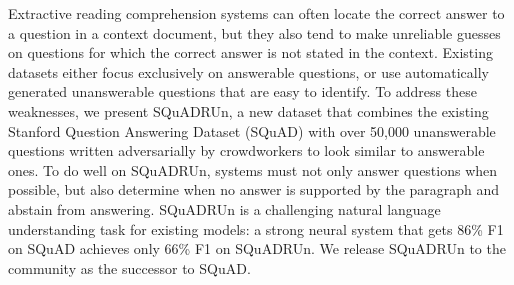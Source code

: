 Extractive reading comprehension systems can often locate the correct answer to a question in a context document, but they also tend to make unreliable guesses on questions for which the correct answer is not stated in the context. Existing datasets either focus exclusively on answerable questions, or use automatically generated unanswerable questions that are easy to identify. To address these weaknesses, we present SQuADRUn, a new dataset that combines the existing Stanford Question Answering Dataset (SQuAD) with over 50,000 unanswerable questions written adversarially by crowdworkers to look similar to answerable ones. To do well on SQuADRUn, systems must not only answer questions when possible, but also determine when no answer is supported by the paragraph and abstain from answering. SQuADRUn is a challenging natural language understanding task for existing models: a strong neural system that gets 86\% F1 on SQuAD achieves only 66\% F1 on SQuADRUn. We release SQuADRUn to the community as the successor to SQuAD.
